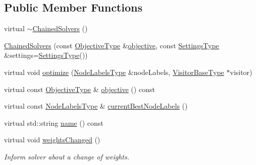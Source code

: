 \subsection*{Public Member Functions}
\begin{DoxyCompactItemize}
\item 
virtual \hyperlink{classnifty_1_1graph_1_1opt_1_1multicut_1_1ChainedSolvers_aa9692bb78b9077ca8639a22094258f9d}{$\sim$\+Chained\+Solvers} ()
\item 
\hyperlink{classnifty_1_1graph_1_1opt_1_1multicut_1_1ChainedSolvers_addd0fb2e11bb42fdf100b506675008dc}{Chained\+Solvers} (const \hyperlink{classnifty_1_1graph_1_1opt_1_1multicut_1_1ChainedSolvers_a4d9fa96d1a27a875c036b01bf547c1d0}{Objective\+Type} \&\hyperlink{classnifty_1_1graph_1_1opt_1_1multicut_1_1ChainedSolvers_aa984a28cef63a284b9fb49fd0694978c}{objective}, const \hyperlink{structnifty_1_1graph_1_1opt_1_1multicut_1_1ChainedSolvers_1_1SettingsType}{Settings\+Type} \&settings=\hyperlink{structnifty_1_1graph_1_1opt_1_1multicut_1_1ChainedSolvers_1_1SettingsType}{Settings\+Type}())
\item 
virtual void \hyperlink{classnifty_1_1graph_1_1opt_1_1multicut_1_1ChainedSolvers_a35f50873fbb92878b0364f1bd53a8abb}{optimize} (\hyperlink{classnifty_1_1graph_1_1opt_1_1multicut_1_1ChainedSolvers_a44d5163a198e88948d9301370c2aead5}{Node\+Labels\+Type} \&node\+Labels, \hyperlink{classnifty_1_1graph_1_1opt_1_1multicut_1_1ChainedSolvers_a2023073333edc978eca4a4fb8d06ae1b}{Visitor\+Base\+Type} $\ast$visitor)
\item 
virtual const \hyperlink{classnifty_1_1graph_1_1opt_1_1multicut_1_1ChainedSolvers_a4d9fa96d1a27a875c036b01bf547c1d0}{Objective\+Type} \& \hyperlink{classnifty_1_1graph_1_1opt_1_1multicut_1_1ChainedSolvers_aa984a28cef63a284b9fb49fd0694978c}{objective} () const
\item 
virtual const \hyperlink{classnifty_1_1graph_1_1opt_1_1multicut_1_1ChainedSolvers_a44d5163a198e88948d9301370c2aead5}{Node\+Labels\+Type} \& \hyperlink{classnifty_1_1graph_1_1opt_1_1multicut_1_1ChainedSolvers_ad62c0b4a0b11f70020c9e668013aae6a}{current\+Best\+Node\+Labels} ()
\item 
virtual std\+::string \hyperlink{classnifty_1_1graph_1_1opt_1_1multicut_1_1ChainedSolvers_a32a1e08e4650b8004d3e97afadec2380}{name} () const
\item 
virtual void \hyperlink{classnifty_1_1graph_1_1opt_1_1multicut_1_1ChainedSolvers_ac87503e00006560417c7ab7af4685383}{weights\+Changed} ()
\begin{DoxyCompactList}\small\item\em Inform solver about a change of weights. \end{DoxyCompactList}\end{DoxyCompactItemize}


